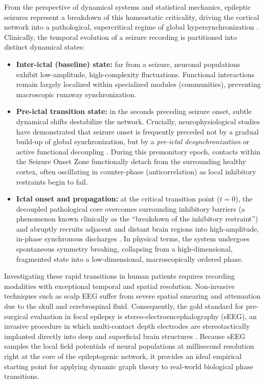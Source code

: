From the perspective of dynamical systems and statistical mechanics, epileptic seizures represent a breakdown of this homeostatic criticality, driving the cortical network into a pathological, supercritical regime of global hypersynchronization \cite{kramer2010coalescence, jiruska2013synchronization}. Clinically, the temporal evolution of a seizure recording is partitioned into distinct dynamical states:
\begin{itemize}
    \item \textbf{Inter-ictal (baseline) state:} far from a seizure, neuronal populations exhibit low-amplitude, high-complexity fluctuations. Functional interactions remain largely localized within specialized modules (communities), preventing macroscopic runaway synchronization.
    \item \textbf{Pre-ictal transition state:} in the seconds preceding seizure onset, subtle dynamical shifts destabilize the network. Crucially, neurophysiological studies have demonstrated that seizure onset is frequently preceded not by a gradual build-up of global synchronization, but by a \textit{pre-ictal desynchronization} or active functional decoupling \cite{mormann2003epileptic, jiruska2013synchronization}. During this premonitory epoch, contacts within the Seizure Onset Zone functionally detach from the surrounding healthy cortex, often oscillating in counter-phase (anticorrelation) as local inhibitory restraints begin to fail.
    \item \textbf{Ictal onset and propagation:} at the critical transition point ($t = 0$), the decoupled pathological core overcomes surrounding inhibitory barriers (a phenomenon known clinically as the ``breakdown of the inhibitory restraint'') and abruptly recruits adjacent and distant brain regions into high-amplitude, in-phase synchronous discharges \cite{bartolomei2001dynamical}. In physical terms, the system undergoes spontaneous symmetry breaking, collapsing from a high-dimensional, fragmented state into a low-dimensional, macroscopically ordered phase.
\end{itemize}

Investigating these rapid transitions in human patients requires recording modalities with exceptional temporal and spatial resolution. Non-invasive techniques such as scalp EEG suffer from severe spatial smearing and attenuation due to the skull and cerebrospinal fluid. Consequently, the gold standard for pre-surgical evaluation in focal epilepsy is stereo-electroencephalography (sEEG), an invasive procedure in which multi-contact depth electrodes are stereotactically implanted directly into deep and superficial brain structures \cite{bartolomei2001dynamical}. Because sEEG samples the local field potentials of neural populations at millisecond resolution right at the core of the epileptogenic network, it provides an ideal empirical starting point for applying dynamic graph theory to real-world biological phase transitions.

